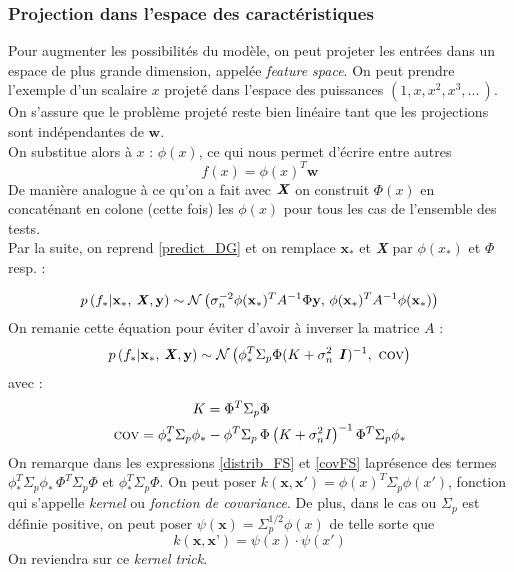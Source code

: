 \documentclass[a4paper,12pt]{report}
\newcommand{\bepar}[1]{
	\left( #1 \right)  
}
\numberwithin{equation}{section} %
\begin{document}
\subsubsection*{Projection dans l'espace des caractéristiques}
Pour augmenter les possibilités du modèle, on peut projeter les entrées dans un espace de plus grande dimension, appelée \textit{feature space}. On peut prendre l'exemple d'un scalaire $x$ projeté dans l'espace des puissances $\left( 1, x, x^2, x^3,...\,  \right )$.\\
On s'assure que le problème projeté reste bien linéaire tant que les projections sont indépendantes de $\textbf{w}$.\\ 
On substitue alors à $x$ : $\phi(x)$, ce qui nous permet d'écrire entre autres 
\begin{equation}
f(x) = \phi(x)^T\textbf{w}
\end{equation}
De manière analogue à ce qu'on a fait avec $\textbf{\textit{X}}$ on construit $\Phi(x)$ en concaténant en colone (cette fois) les $\phi(x)$ pour tous les cas de l'ensemble des tests.\\
Par la suite, on reprend \eqref{predict_DG} et on remplace $\textbf{x}_*$ et \textbf{\textit{X}} par $\phi(x_*)$ et $\Phi$ resp. :

\begin{equation}
p\bepar{f_*|\textbf{x}_*,\, \textbf{\textit{X}},\textbf{y}} \sim \mathcal{N}\bepar{\sigma_n^{-2}\phi(\textbf{x}_*)^TA^{-1}\Phi\textbf{y}, \, \phi(\textbf{x}_*)^T A^{-1} \phi(\textbf{x}_*)}
\end{equation}
On remanie cette équation pour éviter d'avoir à inverser la matrice  $A$ :
\begin{equation}
p\bepar{f_*|\textbf{x}_*,\, \textbf{\textit{X}},\textbf{y}} \sim \mathcal{N}\bepar{\phi_*^T \Sigma_p \Phi(K + \sigma_n^2 \textbf{ \textit{I}})^{-1}, \, \, \textsc{cov}} \label{distrib_FS}
\end{equation}
avec :
\begin{align}
K = \Phi^T \Sigma_p\Phi& \\
\textsc{cov} = \phi_*^T\Sigma_p\phi_* - \phi^T\Sigma_p\,\Phi&\left(K  + \sigma_n^2\mathbf{\mathit{I}}\right)^{-1}\Phi^T \Sigma_p\phi_* \label{covFS}
\end{align}
On remarque dans les expressions \eqref{distrib_FS} et \eqref{covFS} laprésence des termes $\displaystyle \phi_*^T\Sigma_p\phi_*\, \Phi^T\Sigma_p\Phi$ et $\phi_*^T\Sigma_p\Phi$. On peut poser $\displaystyle k(\textbf{x}, \textbf{x}') = \phi(x)^T\Sigma_p\phi(x')$, fonction qui s'appelle \textit{kernel} ou \textit{fonction de covariance}. De plus, dans le cas ou $\Sigma_p$ est définie positive, on peut poser $\displaystyle \psi(\textbf{x}) = \Sigma_p^{1/2} \phi(x)$ de telle sorte que
\begin{equation}
k(\textbf{x}, \textbf{x'}) = \psi(x)\cdot \psi(x')
\end{equation}
On reviendra sur ce \textit{kernel trick}.\\
\end{document}
